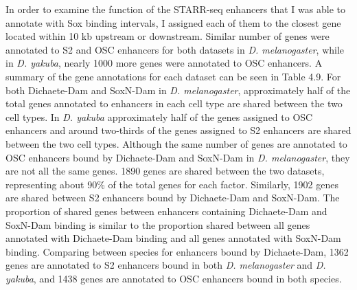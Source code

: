 In order to examine the function of the STARR-seq enhancers that I was able to annotate with Sox binding intervals, I assigned each of them to the closest gene located within 10 kb upstream or downstream. Similar number of genes were annotated to S2 and OSC enhancers for both datasets in \emph{D. melanogaster}, while in \emph{D. yakuba}, nearly 1000 more genes were annotated to OSC enhancers. A summary of the gene annotations for each dataset can be seen in Table 4.9. For both Dichaete-Dam and SoxN-Dam in \emph{D. melanogaster}, approximately half of the total genes annotated to enhancers in each cell type are shared between the two cell types. In \emph{D. yakuba} approximately half of the genes assigned to OSC enhancers and around two-thirds of the genes assigned to S2 enhancers are shared between the two cell types. Although the same number of genes are annotated to OSC enhancers bound by Dichaete-Dam and SoxN-Dam in \emph{D. melanogaster}, they are not all the same genes. 1890 genes are shared between the two datasets, representing about 90\% of the total genes for each factor. Similarly, 1902 genes are shared between S2 enhancers bound by Dichaete-Dam and SoxN-Dam. The proportion of shared genes between enhancers containing Dichaete-Dam and SoxN-Dam binding is similar to the proportion shared between all genes annotated with Dichaete-Dam binding and all genes annotated with SoxN-Dam binding. Comparing between species for enhancers bound by Dichaete-Dam, 1362 genes are annotated to S2 enhancers bound in both \emph{D. melanogaster} and \emph{D. yakuba}, and 1438 genes are annotated to OSC enhancers bound in both species.\\

